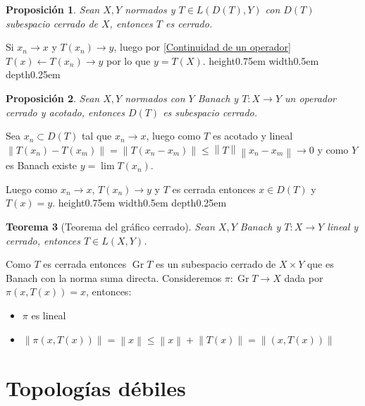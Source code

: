 \documentclass[11pt]{article}
\newcommand{\norm}[1]{\left\lVert#1\right\rVert}
\DeclareMathOperator{\graf}{Gr}
\newtheorem{theorem}{Teorema}
\numberwithin{theorem}{subsection}
\newtheorem{proposition}[theorem]{Proposici\'on}
\newenvironment{proof}[1][Demostraci\'on]{\begin{trivlist}
		\item[\hskip \labelsep {\bfseries #1}]}{\end{trivlist}}
\newcommand{\qed}{\nobreak \ifvmode \relax \else
	\ifdim\lastskip<1.5em \hskip-\lastskip
	\hskip1.5em plus0em minus0.5em \fi \nobreak
	\vrule height0.75em width0.5em depth0.25em\fi}
\begin{document}
\begin{proposition}
	Sean $X,Y$ normados y $T \in L(D(T),Y)$ con $D(T)$ subespacio cerrado de $X$, entonces $T$ es cerrado.
\end{proposition}

\begin{proof}
	Si $x_n \rightarrow x$ y $T(x_n) \rightarrow y$, luego por \ref{Continuidad de un operador} $T(x) \leftarrow T(x_n) \rightarrow y$ por lo que $y = T(X)$. \qed
\end{proof}

\begin{proposition}
	Sean $X,Y$ normados con $Y$ Banach y $T: X \rightarrow Y$ un operador cerrado y acotado, entonces $D(T)$ es subespacio cerrado.
\end{proposition}

\begin{proof}
	Sea $x_n \subset D(T)$ tal que $x_n \rightarrow x$, luego como $T$ es acotado y lineal $\norm{T(x_n) - T(x_m)} = \norm{T \left(x_n-x_m\right)} \leq \norm{T} \norm{x_n-x_m} \rightarrow 0$ y como $Y$ es Banach existe $y = \lim T(x_n)$.
	
	Luego como $x_n \rightarrow x$, $T(x_n) \rightarrow y$ y $T$ es cerrada entonces $x \in D(T)$ y $T(x) = y$. \qed
	
\end{proof}

\begin{theorem}[Teorema del gr\'afico cerrado]
	\label{Teorema del grafico cerrado}
	Sean $X,Y$ Banach y $T:X \rightarrow Y$ lineal y cerrado, entonces $T \in L(X,Y)$. 
\end{theorem}

\begin{proof}
	Como $T$ es cerrada entonces $\graf T$ es un subespacio cerrado de $X \times Y$ que es Banach con la norma suma directa. Consideremos $\pi: \graf T \rightarrow X$ dada por $\pi(x,T(x)) = x$, entonces:
	
	\begin{itemize}
		\item $\pi$ es lineal
		\item $\norm{\pi(x,T(x))} = \norm{x} \leq \norm{x} + \norm{T(x)} = \norm{(x,T(x))}$
		
	\end{itemize}
	
\end{proof}

\section{Topolog\'ias d\'ebiles}
\end{document}
